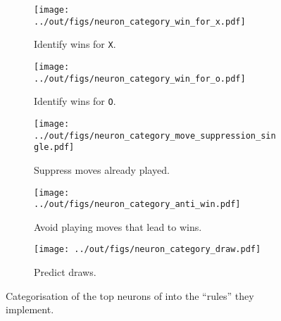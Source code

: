 \begin{figure}[t]
    \centering
    \begin{subfigure}[b]{0.49\linewidth}
        \texttt{[image: ../out/figs/neuron\_category\_win\_for\_x.pdf]}
        \caption{Identify wins for \texttt{X}.}
        \label{fig:neurons-x-win}
    \end{subfigure}%
    \hfill
    \begin{subfigure}[b]{0.49\linewidth}
        \texttt{[image: ../out/figs/neuron\_category\_win\_for\_o.pdf]}
        \caption{Identify wins for \texttt{O}.}
        \label{fig:neurons-o-win}
    \end{subfigure}
    \begin{subfigure}[b]{0.49\linewidth}
        \texttt{[image: ../out/figs/neuron\_category\_move\_suppression\_single.pdf]}
        \caption{Suppress moves already played.}
        \label{fig:neurons-suppress-single}
    \end{subfigure}%
    \hfill
    \begin{subfigure}[b]{0.49\linewidth}
        \texttt{[image: ../out/figs/neuron\_category\_anti\_win.pdf]}
        \caption{Avoid playing moves that lead to wins.}
        \label{fig:neurons-suppress-win}
    \end{subfigure}
    \begin{subfigure}[b]{0.49\linewidth}
        \texttt{[image: ../out/figs/neuron\_category\_draw.pdf]}
        \caption{Predict draws.}
    \end{subfigure}
    \caption{Categorisation of the top neurons of \ttgpt into the ``rules'' they implement.}
    \label{fig:neuron-categories}
\end{figure}